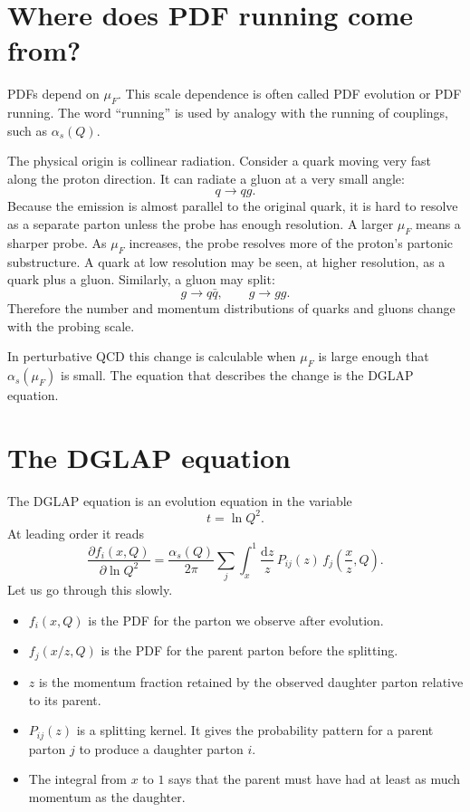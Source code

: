\documentclass[11pt]{article}
\newcommand{\dd}{\mathrm{d}}
\newcommand{\as}{\alpha_s}
\newcommand{\muf}{\mu_F}
\begin{document}
\section{Where does PDF running come from?}

PDFs depend on \(\muf\).  This scale dependence is often called PDF evolution
or PDF running.  The word ``running'' is used by analogy with the running of
couplings, such as \(\as(Q)\).

The physical origin is collinear radiation.  Consider a quark moving very fast
along the proton direction.  It can radiate a gluon at a very small angle:
\[
  q \to qg.
\]
Because the emission is almost parallel to the original quark, it is hard to
resolve as a separate parton unless the probe has enough resolution.  A larger
\(\muf\) means a sharper probe.  As \(\muf\) increases, the probe resolves more
of the proton's partonic substructure.  A quark at low resolution may be seen,
at higher resolution, as a quark plus a gluon.  Similarly, a gluon may split:
\[
  g \to q\bar q, \qquad g \to gg.
\]
Therefore the number and momentum distributions of quarks and gluons change
with the probing scale.

In perturbative QCD this change is calculable when \(\muf\) is large enough
that \(\as(\muf)\) is small.  The equation that describes the change is the
DGLAP equation.

\section{The DGLAP equation}

The DGLAP equation is an evolution equation in the variable
\[
  t = \ln Q^2.
\]
At leading order it reads
\[
  \frac{\partial f_i(x,Q)}{\partial \ln Q^2}
  =
  \frac{\as(Q)}{2\pi}
  \sum_j
  \int_x^1
  \frac{\dd z}{z}\,
  P_{ij}(z)\,
  f_j\left(\frac{x}{z},Q\right).
\]
Let us go through this slowly.

\begin{itemize}
  \item \(f_i(x,Q)\) is the PDF for the parton we observe after evolution.
  \item \(f_j(x/z,Q)\) is the PDF for the parent parton before the splitting.
  \item \(z\) is the momentum fraction retained by the observed daughter
        parton relative to its parent.
  \item \(P_{ij}(z)\) is a splitting kernel.  It gives the probability pattern
        for a parent parton \(j\) to produce a daughter parton \(i\).
  \item The integral from \(x\) to \(1\) says that the parent must have had at
        least as much momentum as the daughter.
\end{itemize}
\end{document}
